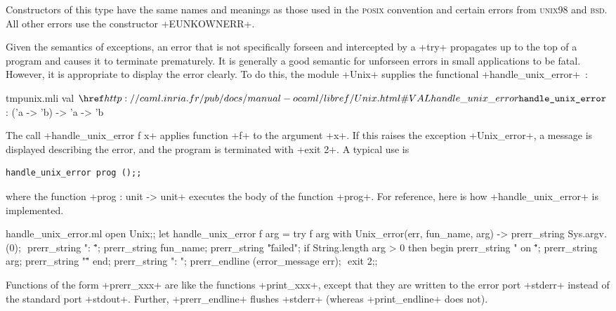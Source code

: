 Constructors of this type have the same names and meanings as those
used in the \textsc{posix} convention and  certain errors from
\textsc{unix98} and \textsc{bsd}. All other errors use the constructor \ml+EUNKOWNERR+.

Given the semantics of exceptions, an error that is not specifically
forseen and intercepted by a \ml+try+ propagates up to the top of a
program and causes it to terminate prematurely.  It is generally a
good semantic for unforseen errors in small applications to be
fatal. However, it is appropriate to display the error clearly. To do
this, the module \ml+Unix+ supplies the functional
\ml+handle_unix_error+~:

%
\begin{listingcodefile}{tmpunix.mli}
val $\indexlibvalue{Unix}{handle\_unix\_error}$ : ('a -> 'b) -> 'a -> 'b
\end{listingcodefile}
%


The call  \ml+handle_unix_error f x+ applies function  \ml+f+ to the
argument \ml+x+. If this raises the exception \ml+Unix_error+, a
message is displayed describing the error, and the program is
terminated with  \ml+exit 2+. A typical use is



%
\begin{lstlisting}
handle_unix_error prog ();;
\end{lstlisting}
%

where the function  \ml+prog : unit -> unit+  executes the body of the
function  \ml+prog+. For reference, here is how
\ml+handle_unix_error+ is implemented.

\begin{listingcodefile}[style=numbers]{handle_unix_error.ml}
open Unix;;
let handle_unix_error f arg =
  try
    f arg
  with Unix_error(err, fun_name, arg) ->
    prerr_string Sys.argv.(0); $\label{prog:argv}$
    prerr_string ": \"";
    prerr_string fun_name;
    prerr_string "\" failed";
    if String.length arg > 0 then begin
      prerr_string " on \"";
      prerr_string arg;
      prerr_string "\""
    end;
    prerr_string ": ";
    prerr_endline (error_message err); $\label{prog:errmsg}$
    exit 2;;
\end{listingcodefile}
%

Functions of the form \ml+prerr_xxx+ are like the functions
\ml+print_xxx+, except that they are written to the error port
\ml+stderr+ instead of the standard port \ml+stdout+. Further,
\ml+prerr_endline+ flushes \ml+stderr+ (whereas \ml+print_endline+ does not).


